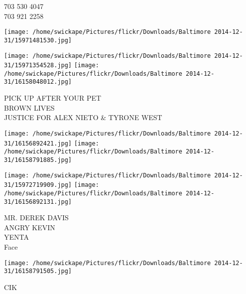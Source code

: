 \documentclass[10pt,letterpaper]{article}
\begin{document}
703 530 4047\\
703 921 2258
\pagebreak

\texttt{[image: /home/swickape/Pictures/flickr/Downloads/Baltimore 2014-12-31/15971481530.jpg]}

\vspace{0.25in}
\texttt{[image: /home/swickape/Pictures/flickr/Downloads/Baltimore 2014-12-31/15971354528.jpg]}
\texttt{[image: /home/swickape/Pictures/flickr/Downloads/Baltimore 2014-12-31/16158048012.jpg]}

PICK UP AFTER YOUR PET\\
BROWN LIVES\\
JUSTICE FOR ALEX NIETO \& TYRONE WEST
\pagebreak

\texttt{[image: /home/swickape/Pictures/flickr/Downloads/Baltimore 2014-12-31/16156892421.jpg]}
\texttt{[image: /home/swickape/Pictures/flickr/Downloads/Baltimore 2014-12-31/16158791885.jpg]}

\texttt{[image: /home/swickape/Pictures/flickr/Downloads/Baltimore 2014-12-31/15972719909.jpg]}
\texttt{[image: /home/swickape/Pictures/flickr/Downloads/Baltimore 2014-12-31/16156892131.jpg]}

MR. DEREK DAVIS\\
ANGRY KEVIN\\
YENTA\\
Face
\pagebreak

\texttt{[image: /home/swickape/Pictures/flickr/Downloads/Baltimore 2014-12-31/16158791505.jpg]}

CIK
\pagebreak
\end{document}
